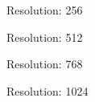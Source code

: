 \label{sec:exp_video}
\begin{figure}[t]
    \centering
    \begin{minipage}{\linewidth}
        \centering
        \begin{minipage}{0.24\linewidth} \centering \small Resolution: 256 \end{minipage}%
        \hfill
        \begin{minipage}{0.24\linewidth} \centering \small Resolution: 512 \end{minipage}%
        \hfill
        \begin{minipage}{0.24\linewidth} \centering \small Resolution: 768 \end{minipage}%
        \hfill
        \begin{minipage}{0.24\linewidth} \centering \small Resolution: 1024 \end{minipage}
    \end{minipage}
    \vspace{2pt}




\end{figure}
